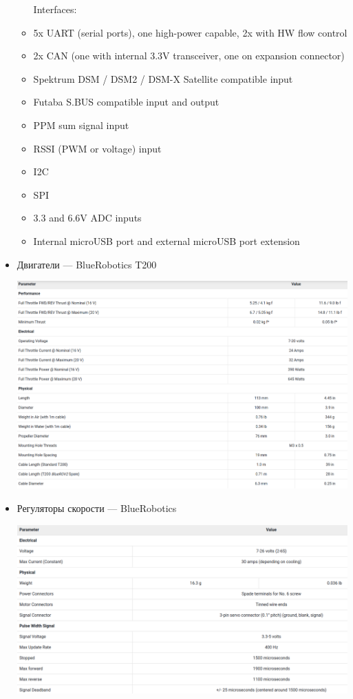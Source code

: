 \begin{itemize}
\begin{itemize}
        Interfaces: 
        \item 5x UART (serial ports), one high-power capable, 2x with HW flow control
        \item 2x CAN (one with internal 3.3V transceiver, one on expansion connector)
        \item Spektrum DSM / DSM2 / DSM-X Satellite compatible input
        \item Futaba S.BUS compatible input and output
        \item PPM sum signal input
        \item RSSI (PWM or voltage) input
        \item I2C
        \item SPI
        \item 3.3 and 6.6V ADC inputs
        \item  Internal microUSB port and external microUSB port extension
    \newpage
    \end{itemize}
    \item Двигатели --- BlueRobotics T200
    \begin{center}
        \includegraphics[width=1\textwidth]{img/thrs-table.png}\\
    \end{center} 
    \item Регуляторы скорости --- BlueRobotics
    \begin{center}
        \includegraphics[width=1\textwidth]{img/esc.png}\\
    \end{center} 
    

\end{itemize}
